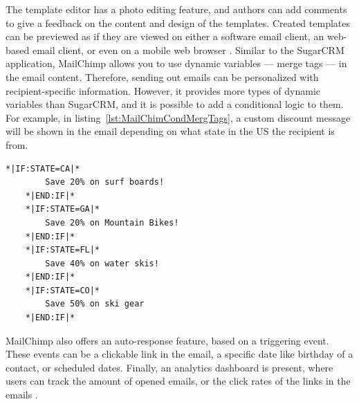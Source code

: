 The template editor has a photo editing feature, and authors can add comments to give a feedback on the content and design of the templates. Created templates can be previewed as if they are viewed on either a software email client, an web-based email client, or even on a mobile web browser \citep{TheRocketScienceGroupLLC2013a}. Similar to the SugarCRM application, MailChimp allows you to use dynamic variables --- merge tags --- in the email content. Therefore, sending out emails can be personalized with recipient-specific information. However, it provides more types of dynamic variables than SugarCRM, and it is possible to add a conditional logic to them. For example, in listing~\ref{lst:MailChimCondMergTags}, a custom discount message will be shown in the email depending on what state in the US the recipient is from.
\vspace{1cm}


\begin{lstlisting}[language=XML, caption={[MailChimp's Conditional Merge Tags]MailChimp's Conditional Merge Tags \citep{TheRocketScienceGroupLLC2013b}}, label={lst:MailChimCondMergTags}]
	*|IF:STATE=CA|*
		Save 20% on surf boards!
	*|END:IF|* 
	*|IF:STATE=GA|*
		Save 20% on Mountain Bikes!
	*|END:IF|* 
	*|IF:STATE=FL|*
		Save 40% on water skis!
	*|END:IF|* 
	*|IF:STATE=CO|*
		Save 50% on ski gear
	*|END:IF|*
\end{lstlisting}

MailChimp also offers an auto-response feature, based on a triggering event. These events can be a clickable link in the email, a specific date like birthday of a contact, or scheduled dates. Finally, an analytics dashboard is present, where users can track the amount of opened emails, or the click rates of the links in the emails \citep{TheRocketScienceGroupLLC2013c,TheRocketScienceGroupLLC2013d,TheRocketScienceGroupLLC2013e}.

